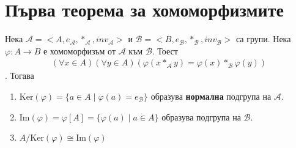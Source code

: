 \documentclass[12pt]{article}
\begin{document}
\section{Първа теорема за хомоморфизмите}
Нека \(\mathcal{A} = <A, e_\mathcal{A}, *_\mathcal{A}, inv_\mathcal{A}>\)
и \(\mathcal{B} = <B, e_\mathcal{B}, *_\mathcal{B}, inv_\mathcal{B}>\) са групи.
Нека \(\varphi : A \to B\) е хомоморфизъм от \(\mathcal{A}\) към \(\mathcal{B}\).
Тоест \begin{align*}
    (\forall x \in A)(\forall y \in A)(\varphi(x *_\mathcal{A} y) = \varphi(x) *_\mathcal{B} \varphi(y))
\end{align*}. Тогава
\begin{enumerate}
    \item \(\mathrm{Ker}(\varphi) = \{a \in A \; | \; \varphi(a) = e_\mathcal{B}\}\) образува \textbf{нормална} подгрупа на \(\mathcal{A}\).
    \item \(\mathrm{Im}(\varphi) = \varphi[A] = \{\varphi(a) \; | \; a \in A\} \) образува подгрупа на \(\mathcal{B}\).
    \item \(A / \mathrm{Ker}(\varphi) \cong \mathrm{Im}(\varphi)\)
\end{enumerate}
\end{document}
